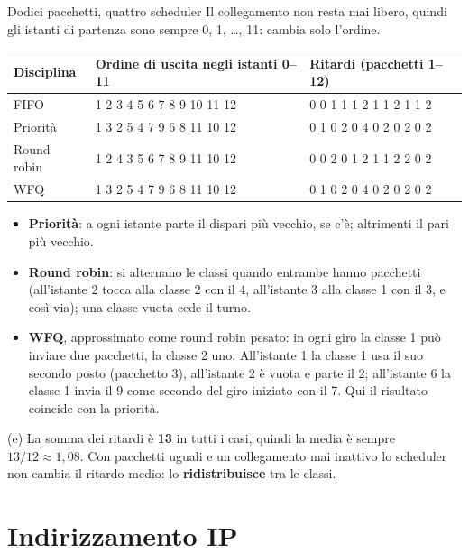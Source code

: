\begin{esercizio}{Dodici pacchetti, quattro scheduler}
\svolgimento
Il collegamento non resta mai libero, quindi gli istanti di partenza sono sempre 0, 1, \dots, 11: cambia solo l'ordine.
\begin{center}
\small
\begin{tabular}{lll}
\toprule
\textbf{Disciplina} & \textbf{Ordine di uscita negli istanti 0--11} & \textbf{Ritardi (pacchetti 1--12)} \\
\midrule
FIFO & 1 2 3 4 5 6 7 8 9 10 11 12 & 0 0 1 1 1 2 1 1 2 1 1 2 \\
Priorità & 1 3 2 5 4 7 9 6 8 11 10 12 & 0 1 0 2 0 4 0 2 0 2 0 2 \\
Round robin & 1 2 4 3 5 6 7 8 9 11 10 12 & 0 0 2 0 1 2 1 1 2 2 0 2 \\
WFQ & 1 3 2 5 4 7 9 6 8 11 10 12 & 0 1 0 2 0 4 0 2 0 2 0 2 \\
\bottomrule
\end{tabular}
\end{center}
\begin{itemize}
    \item \textbf{Priorità}: a ogni istante parte il dispari più vecchio, se c'è; altrimenti il pari più vecchio.
    \item \textbf{Round robin}: si alternano le classi quando entrambe hanno pacchetti (all'istante 2 tocca alla classe 2 con il 4, all'istante
          3 alla classe 1 con il 3, e così via); una classe vuota cede il turno.
    \item \textbf{WFQ}, approssimato come round robin pesato: in ogni giro la classe 1 può inviare due pacchetti, la classe 2 uno. All'istante
          1 la classe 1 usa il suo secondo posto (pacchetto 3), all'istante 2 è vuota e parte il 2; all'istante 6 la classe 1 invia il 9
          come secondo del giro iniziato con il 7. Qui il risultato coincide con la priorità.
\end{itemize}
(e) La somma dei ritardi è \textbf{13} in tutti i casi, quindi la media è sempre $13/12 \approx 1{,}08$. Con pacchetti uguali e un
collegamento mai inattivo lo scheduler non cambia il ritardo medio: lo \textbf{ridistribuisce} tra le classi.
\end{esercizio}

\section{Indirizzamento IP}

